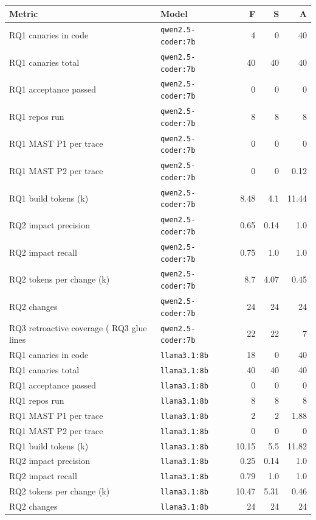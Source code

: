 \begin{tabular}{llrrr}
\toprule
Metric & Model & F & S & A \\
\midrule
RQ1 canaries in code & \texttt{qwen2.5-coder:7b} & 4 & 0 & 40 \\
RQ1 canaries total & \texttt{qwen2.5-coder:7b} & 40 & 40 & 40 \\
RQ1 acceptance passed & \texttt{qwen2.5-coder:7b} & 0 & 0 & 0 \\
RQ1 repos run & \texttt{qwen2.5-coder:7b} & 8 & 8 & 8 \\
RQ1 MAST P1 per trace & \texttt{qwen2.5-coder:7b} & 0 & 0 & 0 \\
RQ1 MAST P2 per trace & \texttt{qwen2.5-coder:7b} & 0 & 0 & 0.12 \\
RQ1 build tokens (k) & \texttt{qwen2.5-coder:7b} & 8.48 & 4.1 & 11.44 \\
RQ2 impact precision & \texttt{qwen2.5-coder:7b} & 0.65 & 0.14 & 1.0 \\
RQ2 impact recall & \texttt{qwen2.5-coder:7b} & 0.75 & 1.0 & 1.0 \\
RQ2 tokens per change (k) & \texttt{qwen2.5-coder:7b} & 8.7 & 4.07 & 0.45 \\
RQ2 changes & \texttt{qwen2.5-coder:7b} & 24 & 24 & 24 \\
RQ3 retroactive coverage (%
RQ3 glue lines & \texttt{qwen2.5-coder:7b} & 22 & 22 & 7 \\
RQ1 canaries in code & \texttt{llama3.1:8b} & 18 & 0 & 40 \\
RQ1 canaries total & \texttt{llama3.1:8b} & 40 & 40 & 40 \\
RQ1 acceptance passed & \texttt{llama3.1:8b} & 0 & 0 & 0 \\
RQ1 repos run & \texttt{llama3.1:8b} & 8 & 8 & 8 \\
RQ1 MAST P1 per trace & \texttt{llama3.1:8b} & 2 & 2 & 1.88 \\
RQ1 MAST P2 per trace & \texttt{llama3.1:8b} & 0 & 0 & 0 \\
RQ1 build tokens (k) & \texttt{llama3.1:8b} & 10.15 & 5.5 & 11.82 \\
RQ2 impact precision & \texttt{llama3.1:8b} & 0.25 & 0.14 & 1.0 \\
RQ2 impact recall & \texttt{llama3.1:8b} & 0.79 & 1.0 & 1.0 \\
RQ2 tokens per change (k) & \texttt{llama3.1:8b} & 10.47 & 5.31 & 0.46 \\
RQ2 changes & \texttt{llama3.1:8b} & 24 & 24 & 24 \\

\end{tabular}

